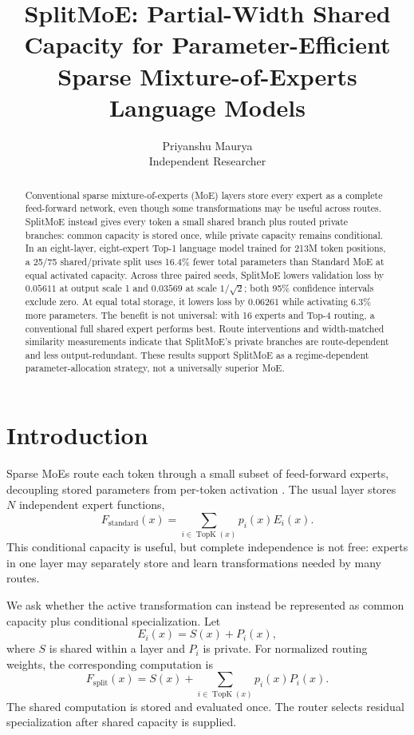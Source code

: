 \documentclass[10pt]{article}
\title{SplitMoE: Partial-Width Shared Capacity for Parameter-Efficient\\Sparse Mixture-of-Experts Language Models}
\author{Priyanshu Maurya\\Independent Researcher}
\date{}
\begin{document}
\maketitle

\begin{abstract}
Conventional sparse mixture-of-experts (MoE) layers store every expert as a complete feed-forward network, even though some transformations may be useful across routes. SplitMoE instead gives every token a small shared branch plus routed private branches: common capacity is stored once, while private capacity remains conditional. In an eight-layer, eight-expert Top-1 language model trained for 213M token positions, a 25/75 shared/private split uses 16.4\% fewer total parameters than Standard MoE at equal activated capacity. Across three paired seeds, SplitMoE lowers validation loss by $0.05611$ at output scale 1 and $0.03569$ at scale $1/\sqrt{2}$; both 95\% confidence intervals exclude zero. At equal total storage, it lowers loss by $0.06261$ while activating 6.3\% more parameters. The benefit is not universal: with 16 experts and Top-4 routing, a conventional full shared expert performs best. Route interventions and width-matched similarity measurements indicate that SplitMoE's private branches are route-dependent and less output-redundant. These results support SplitMoE as a regime-dependent parameter-allocation strategy, not a universally superior MoE.
\end{abstract}

\section{Introduction}
Sparse MoEs route each token through a small subset of feed-forward experts, decoupling stored parameters from per-token activation \citep{shazeer2017outrageously,lepikhin2020gshard,fedus2022switch}. The usual layer stores $N$ independent expert functions,
\begin{equation}
F_{\mathrm{standard}}(x)=\sum_{i\in\operatorname{TopK}(x)}p_i(x)E_i(x).
\end{equation}
This conditional capacity is useful, but complete independence is not free: experts in one layer may separately store and learn transformations needed by many routes.

We ask whether the active transformation can instead be represented as common capacity plus conditional specialization. Let
\begin{equation}
E_i(x)=S(x)+P_i(x),
\end{equation}
where $S$ is shared within a layer and $P_i$ is private. For normalized routing weights, the corresponding computation is
\begin{equation}
F_{\mathrm{split}}(x)=S(x)+\sum_{i\in\operatorname{TopK}(x)}p_i(x)P_i(x).
\label{eq:split}
\end{equation}
The shared computation is stored and evaluated once. The router selects residual specialization after shared capacity is supplied.
\end{document}
